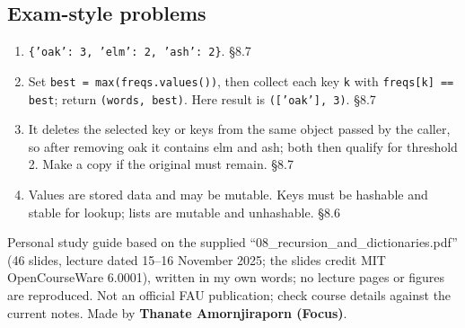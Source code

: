 \documentclass[11pt]{article}
\begin{document}
\begin{keepsection}\subsection{Exam-style problems}

\begin{enumerate}
\item \texttt{\{'oak': 3, 'elm': 2, 'ash': 2\}}. \hfill{\small\color{FAUblue}§8.7}
\item Set \texttt{best = max(freqs.values())}, then collect each key \texttt{k} with \texttt{freqs[k] == best}; return \texttt{(words, best)}. Here result is \texttt{(['oak'], 3)}. \hfill{\small\color{FAUblue}§8.7}
\item It deletes the selected key or keys from the same object passed by the caller, so after removing oak it contains elm and ash; both then qualify for threshold 2. Make a copy if the original must remain. \hfill{\small\color{FAUblue}§8.7}
\item Values are stored data and may be mutable. Keys must be hashable and stable for lookup; lists are mutable and unhashable. \hfill{\small\color{FAUblue}§8.6}
\end{enumerate}

\end{keepsection}

\vfill{\small Personal study guide based on the supplied “08\_recursion\_and\_dictionaries.pdf” (46 slides, lecture dated 15–16 November 2025; the slides credit MIT OpenCourseWare 6.0001), written in my own words; no lecture pages or figures are reproduced. Not an official FAU publication; check course details against the current notes. Made by \textbf{Thanate Amornjiraporn (Focus)}.}
\end{document}
